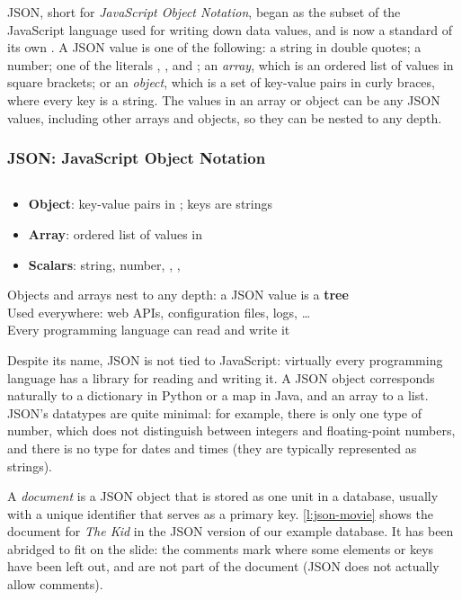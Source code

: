JSON, short for \emph{JavaScript Object Notation}, began as the subset of the JavaScript language used for writing down data values, and is now a standard of its own \citep{RFC8259}.
A JSON value is one of the following: a string in double quotes; a number; one of the literals , , and ; an \emph{array}, which is an ordered list of values in square brackets; or an \emph{object}, which is a set of key-value pairs in curly braces, where every key is a string.
The values in an array or object can be any JSON values, including other arrays and objects, so they can be nested to any depth.

\begin{frame}
    \label{s:json-syntax}
    \frametitle{JSON: JavaScript Object Notation}
    \inputminted[fontsize=\footnotesize]{json}{code/json-example.json}
    \vspace{0.5em}
    \begin{itemize}
        \item \textbf{Object}: key-value pairs in ; keys are strings
        \item \textbf{Array}: ordered list of values in \code{[...]}
        \item \textbf{Scalars}: string, number, , , \\[1em]\pause
    \end{itemize}
    Objects and arrays nest to any depth: a JSON value is a \textbf{tree}\\[1em]
    Used everywhere: web APIs, configuration files, logs, \dots\\
    Every programming language can read and write it
\end{frame}
\label{l:json-syntax}

Despite its name, JSON is not tied to JavaScript: virtually every programming language has a library for reading and writing it.
A JSON object corresponds naturally to a dictionary in Python or a map in Java, and an array to a list.
JSON's datatypes are quite minimal: for example, there is only one type of number, which does not distinguish between integers and floating-point numbers, and there is no type for dates and times (they are typically represented as strings).

A \emph{document} is a JSON object that is stored as one unit in a database, usually with a unique identifier that serves as a primary key.
\autoref{l:json-movie} shows the document for \emph{The Kid} in the JSON version of our example database.
It has been abridged to fit on the slide: the comments  mark where some elements or keys have been left out, and are not part of the document (JSON does not actually allow comments).

